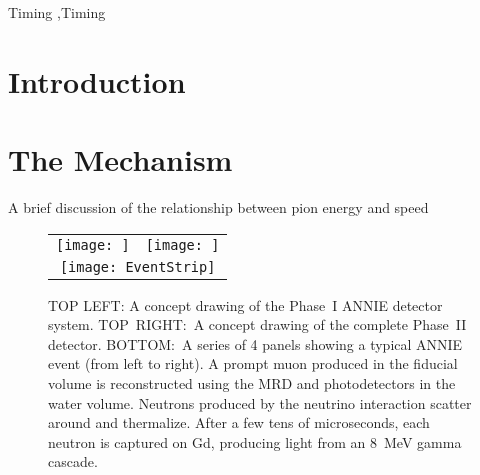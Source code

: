 \documentclass[preprint,12pt]{elsarticle}
\begin{document}
\begin{frontmatter}
\begin{abstract}
\end{abstract}



\begin{keyword}
Timing \sep Timing


\end{keyword}

\end{frontmatter}

\linenumbers

\section{Introduction}
\label{sec:intro}






\section{The Mechanism}

A brief discussion of the relationship between pion energy and speed

\begin{figure}[t]
	\begin{center}
           	\begin{tabular}{c c}	
			\texttt{[image: ]} &
            \texttt{[image: ]} \\

            \multicolumn{2}{c}{\texttt{[image: EventStrip]}}
			\end{tabular}
	\end{center}
	\caption{ TOP LEFT: A concept drawing of the Phase~I ANNIE detector system. 
    TOP~RIGHT:~A concept drawing of the complete Phase~II detector.
    BOTTOM:~A series of 4 panels showing a typical ANNIE event (from left to right). A prompt muon produced in the fiducial volume is reconstructed using the MRD and photodetectors in the water volume. Neutrons produced by the neutrino interaction scatter around and thermalize. After a few tens of microseconds, each neutron is captured on Gd, producing light from an 8~MeV gamma cascade.}
		\label{fig:anniedetector}
\end{figure}
\end{document}
